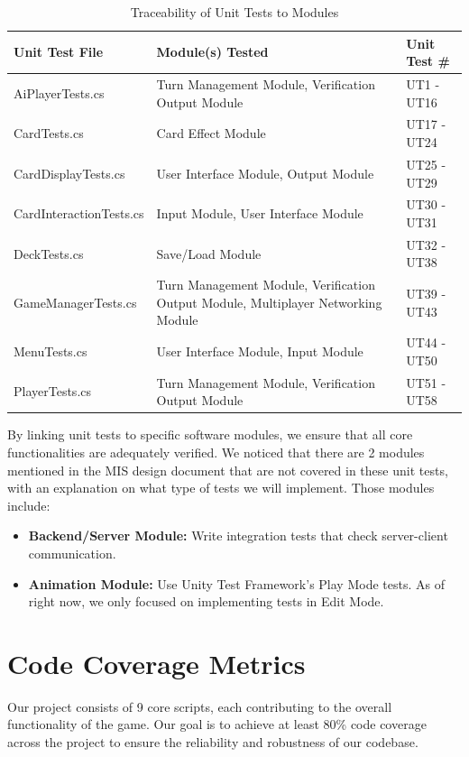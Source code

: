 \documentclass[12pt, titlepage]{article}
\begin{document}
\begin{table}[H]
    \centering
    \begin{tabularx}{\textwidth}{|l|X|l|}
        \hline
        \textbf{Unit Test File} & \textbf{Module(s) Tested} & \textbf{Unit Test \#} \\
        \hline
        AiPlayerTests.cs & Turn Management Module, Verification Output Module & UT1 - UT16 \\
        \hline
        CardTests.cs & Card Effect Module & UT17 - UT24 \\
        \hline
        CardDisplayTests.cs & User Interface Module, Output Module & UT25 - UT29 \\
        \hline
        CardInteractionTests.cs & Input Module, User Interface Module & UT30 - UT31 \\
        \hline
        DeckTests.cs & Save/Load Module & UT32 - UT38 \\
        \hline
        GameManagerTests.cs & Turn Management Module, Verification Output Module, Multiplayer Networking Module & UT39 - UT43 \\
        \hline
        MenuTests.cs & User Interface Module, Input Module & UT44 - UT50 \\
        \hline
        PlayerTests.cs & Turn Management Module, Verification Output Module & UT51 - UT58 \\
        \hline
    \end{tabularx}
    \caption{Traceability of Unit Tests to Modules}
    \label{tab:trace_unit_tests}
\end{table}

By linking unit tests to specific software modules, we ensure that all core functionalities are adequately verified. We noticed that there are 2 modules mentioned in the MIS design document that are not covered in these unit tests, with an explanation on what type of tests we will implement. Those modules include:
\begin{itemize}
    \item \textbf{Backend/Server Module:} Write integration tests that check server-client communication.
    \item \textbf{Animation Module:} Use Unity Test Framework’s Play Mode tests. As of right now, we only focused on implementing tests in Edit Mode.
\end{itemize}

\section{Code Coverage Metrics}
Our project consists of 9 core scripts, each contributing to the overall functionality of the game. Our goal is to achieve at least 80\% code coverage across the project to ensure the reliability and robustness of our codebase.
\end{document}
